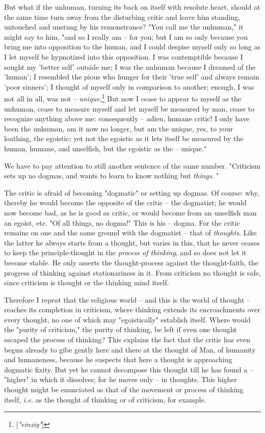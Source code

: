 \documentclass[a4paper]{book}
\begin{document}
But what if the unhuman, turning its back on itself with resolute heart, 
should at the same time turn away from the disturbing critic and leave him 
standing, untouched and unstung by his remonstrance? "{}You call me the 
unhuman,"{} it might say to him, "{}and so I really am -- for you; but I am so 
only because you bring me into opposition to the human, and I could despise 
myself only so long as I let myself be hypnotized into this opposition. I was 
contemptible because I sought my 'better self' outside me; I was the unhuman 
because I dreamed of the 'human'; I resembled the pious who hunger for their 
'true self' and always remain 'poor sinners'; I thought of myself only in 
comparison to another; enough, I was not all in all, was not -- 
\textit{unique}.\footnote{[\textit{"{}einzig"{}}]} But now I cease to appear 
to myself as the unhuman, cease to measure myself and let myself be measured 
by man, cease to recognize anything above me: consequently -- adieu, humane 
critic! I only have been the unhuman, am it now no longer, but am the unique, 
yes, to your loathing, the egoistic; yet not the egoistic as it lets itself be 
measured by the human, humane, and unselfish, but the egoistic as the -- 
unique."{}

We have to pay attention to still another sentence of the same number. 
"{}Criticism sets up no dogmas, and wants to learn to know nothing but 
\textit{things}. "{}

The critic is afraid of becoming "{}dogmatic"{} or setting up dogmas. Of 
course: why, thereby he would become the opposite of the critic -- the 
dogmatist; he would now become bad, as he is good as critic, or would become 
from an unselfish man an egoist, etc. "{}Of all things, no dogma!"{} This is 
his -- dogma. For the critic remains on one and the same ground with the 
dogmatist -- that of \textit{thoughts}. Like the latter he always starts from 
a thought, but varies in this, that he never ceases to keep the 
principle-thought in the \textit{process of thinking}, and so does not let it 
become stable. He only asserts the thought-process against the thought-faith, 
the progress of thinking against stationariness in it. From criticism no 
thought is safe, since criticism is thought or the thinking mind itself.

Therefore I repeat that the religious world -- and this is the world of 
thought -- reaches its completion in criticism, where thinking extends its 
encroachments over every thought, no one of which may "{}egoistically"{} 
establish itself. Where would the "{}purity of criticism,"{} the purity of 
thinking, be left if even one thought escaped the process of thinking? This 
explains the fact that the critic has even begun already to gibe gently here 
and there at the thought of Man, of humanity and humaneness, because he 
suspects that here a thought is approaching dogmatic fixity. But yet he cannot 
decompose this thought till he has found a -- "{}higher"{} in which it 
dissolves; for he moves only -- in thoughts. This higher thought might be 
enunciated as that of the movement or process of thinking itself, 
\textit{i.e.} as the thought of thinking or of criticism, for example.
\end{document}
